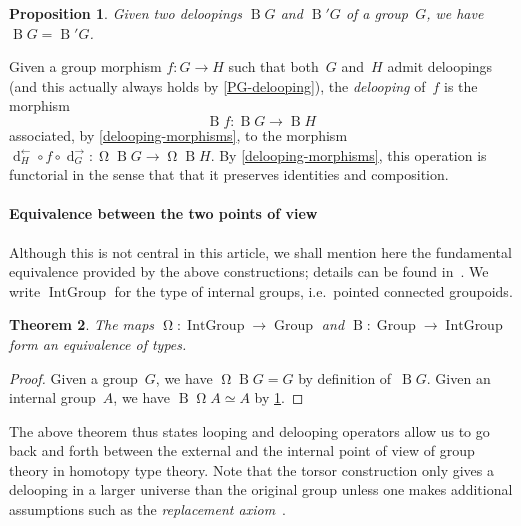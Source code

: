 \documentclass[10pt,a4paper]{amsart}
\newtheorem{theorem}{Theorem}
\newtheorem{proposition}[theorem]{Proposition}
\theoremstyle{definition}
\newcommand{\B}{\operatorname{B}} %
\newcommand{\transport}[1]{#1^\to} %
\newcommand{\transportinv}[1]{#1^\ot} %
\newcommand{\Beq}[1]{\operatorname{d}_{#1}} %
\newcommand{\Loop}{\operatorname{\Omega}} %
\newcommand{\Group}{\operatorname{Group}} %
\newcommand{\IGroup}[1][1]{\operatorname{IntGroup}} %
\newcommand{\ot}{\leftarrow}
\newcommand{\ie}{i.e.~}
\begin{document}
\begin{proposition}
  \label{delooping-unique}
  Given two deloopings $\B G$ and $\B' G$ of a group~$G$, we have $\B G=\B' G$.
\end{proposition}

\noindent
Given a group morphism $f:G\to H$ such that both~$G$ and~$H$ admit deloopings
(and this actually always holds by \cref{PG-delooping}), the \emph{delooping} of~$f$ is the morphism
\[
  \B f:\B G\to\B H
\]
associated, by \cref{delooping-morphisms}, to the morphism
$\transportinv{\Beq H}\circ f\circ\transport{\Beq G}:\Loop\B G\to\Loop\B
H$. By \cref{delooping-morphisms}, this operation is functorial in the sense
that that it preserves identities and composition.

\paragraph{Equivalence between the two points of view}
Although this is not central in this article, we shall mention here the
fundamental equivalence provided by the above constructions; details can be
found in~\cite{symmetry}.
%
We write $\IGroup$ for the type of internal groups, \ie pointed connected
groupoids.


\begin{theorem}
  \label{internal-external-equivalence}
  The maps $\Loop:\IGroup\to\Group$ and $\B:\Group\to\IGroup$ form an
  equivalence of types.
\end{theorem}
\begin{proof}
  Given a group~$G$, we have $\Loop\B G=G$ by definition of~$\B G$. Given an
  internal group~$A$, we have $\B\Loop A\simeq A$ by \cref{delooping-unique}.
\end{proof}

\noindent
The above theorem thus states looping and delooping operators allow us to go
back and forth between the external and the internal point of view of group
theory in homotopy type theory. Note that the torsor construction only gives a
delooping in a larger universe than the original group unless one makes
additional assumptions such as the \emph{replacement
  axiom}~\cite[Axiom~18.1.8]{rijke2022introduction}.

\end{document}
